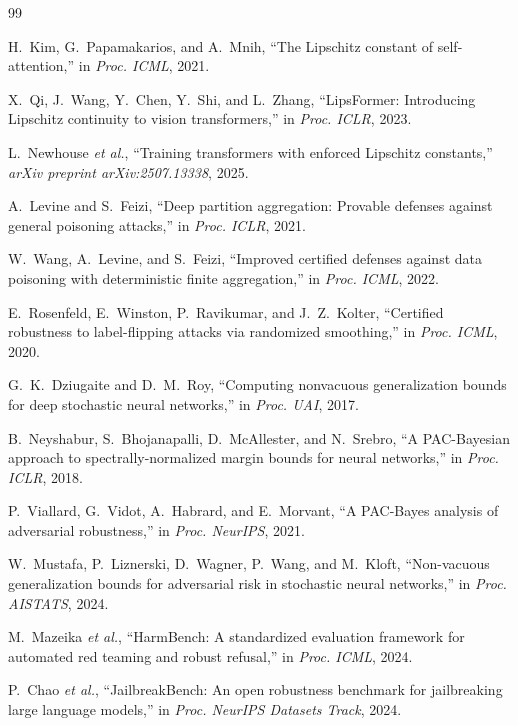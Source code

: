\documentclass[journal,a4paper,10pt]{IEEEtran}
\theoremstyle{definition}
\theoremstyle{remark}
\begin{document}
\begin{thebibliography}{99}

H.~Kim, G.~Papamakarios, and A.~Mnih, ``The {Lipschitz} constant of self-attention,'' in \emph{Proc. ICML}, 2021.

X.~Qi, J.~Wang, Y.~Chen, Y.~Shi, and L.~Zhang, ``{LipsFormer}: Introducing {Lipschitz} continuity to vision transformers,'' in \emph{Proc. ICLR}, 2023.

L.~Newhouse \emph{et al.}, ``Training transformers with enforced {Lipschitz} constants,'' \emph{arXiv preprint arXiv:2507.13338}, 2025.

A.~Levine and S.~Feizi, ``Deep partition aggregation: Provable defenses against general poisoning attacks,'' in \emph{Proc. ICLR}, 2021.

W.~Wang, A.~Levine, and S.~Feizi, ``Improved certified defenses against data poisoning with deterministic finite aggregation,'' in \emph{Proc. ICML}, 2022.

E.~Rosenfeld, E.~Winston, P.~Ravikumar, and J.~Z.~Kolter, ``Certified robustness to label-flipping attacks via randomized smoothing,'' in \emph{Proc. ICML}, 2020.


G.~K.~Dziugaite and D.~M.~Roy, ``Computing nonvacuous generalization bounds for deep stochastic neural networks,'' in \emph{Proc. UAI}, 2017.

B.~Neyshabur, S.~Bhojanapalli, D.~McAllester, and N.~Srebro, ``A {PAC}-Bayesian approach to spectrally-normalized margin bounds for neural networks,'' in \emph{Proc. ICLR}, 2018.

P.~Viallard, G.~Vidot, A.~Habrard, and E.~Morvant, ``A {PAC}-Bayes analysis of adversarial robustness,'' in \emph{Proc. NeurIPS}, 2021.

W.~Mustafa, P.~Liznerski, D.~Wagner, P.~Wang, and M.~Kloft, ``Non-vacuous generalization bounds for adversarial risk in stochastic neural networks,'' in \emph{Proc. AISTATS}, 2024.

M.~Mazeika \emph{et al.}, ``{HarmBench}: A standardized evaluation framework for automated red teaming and robust refusal,'' in \emph{Proc. ICML}, 2024.

P.~Chao \emph{et al.}, ``{JailbreakBench}: An open robustness benchmark for jailbreaking large language models,'' in \emph{Proc. NeurIPS Datasets Track}, 2024.


\end{thebibliography}
\end{document}
